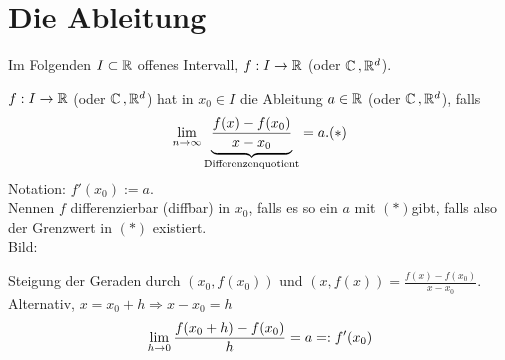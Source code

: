 \documentclass[../ana1.tex]{subfiles}
\begin{document}
\setcounter{section}{17}
\section{Die Ableitung}

Im Folgenden \( I \subset \R \) offenes Intervall, 
\( f: I \rightarrow \R \) (oder \( \C \ko \R^d \)).

\begin{defi}[Ableitung]
    \( f : I \rightarrow \R \) (oder \( \C \ko \R^d \)) 
    hat in \( x_0 \in I \) die Ableitung \( a\in \R \) 
    (oder \( \C \ko \R^d \)), falls 
    \[ \limes{n} \underbrace{\frac{f(x) - f(x_0)}{x - x_0}}_{
        \text{Differenzenquotient}
    } = a. (*) \]
    Notation: \( f'(x_0) := a \).\\
    Nennen \(f\) differenzierbar (diffbar) in \(x_0\), falls 
    es so ein \(a\) mit \((*)\)gibt, falls also der Grenzwert 
    in \((*)\) existiert.\\
    Bild: 
    \begin{center}
        \begin{tikzpicture}
            
        \end{tikzpicture}
    \end{center}
    Steigung der Geraden durch \( (x_0, f(x_0)) \) und 
    \((x, f(x)) = \frac{f(x) - f(x_0)}{x - x_0}\).\\
    Alternativ, \( x = x_0 + h \Rightarrow x - x_0 = h \)
    \[ \limesx{h}{0} \frac{f(x_0 + h) - f(x_0)}{h} = a =: f'(x_0) \]
\end{defi}
\end{document}
